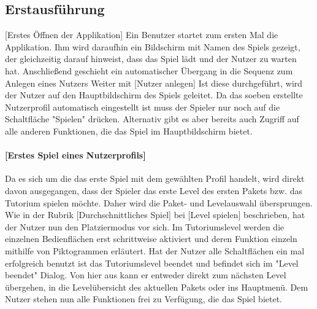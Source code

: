 \subsection{Erstausführung}
{[}Erstes Öffnen der Applikation{]}\newline
Ein Benutzer startet zum ersten Mal die Applikation. Ihm wird daraufhin
ein Bildschirm mit Namen des Spiels gezeigt, der gleichzeitig darauf
hinweist, dass das Spiel lädt und der Nutzer zu warten hat.
Anschließend geschieht ein automatischer Übergang in die Sequenz zum
Anlegen eines Nutzers
\newline
\newline
Weiter mit {[}Nutzer anlegen{]}
\newline
\newline
Ist diese durchgeführt, wird der Nutzer auf den Hauptbildschirm des
Spiels geleitet. Da das soeben erstellte Nutzerprofil automatisch eingestellt
ist muss der Spieler nur noch auf die Schaltfläche "Spielen" drücken.
Alternativ gibt es aber bereits auch Zugriff auf alle anderen Funktionen,
die das Spiel im Hauptbildschirm bietet.
\newline
\newline
\paragraph{{[}Erstes Spiel eines Nutzerprofils{]}}
Da es sich um die das erste Spiel mit dem gewählten Profil handelt, wird 
direkt davon ausgegangen, dass der Spieler das erste Level des ersten 
Pakets bzw. das Tutorium spielen möchte. Daher wird die Paket- und Levelauswahl 
übersprungen. Wie in der Rubrik [Durchschnittliches Spiel] bei [Level spielen] 
beschrieben, hat der Nutzer nun den Platziermodus vor sich. Im Tutoriumslevel 
werden die einzelnen Bedienflächen erst schrittweise aktiviert und deren Funktion
einzeln mithilfe von Piktogrammen erläutert. Hat der Nutzer alle Schaltflächen
ein mal erfolgreich benutzt ist das Tutoriumslevel beendet und befindet
sich im "Level beendet" Dialog. Von hier aus kann er entweder direkt zum
nächsten Level übergehen, in die Levelübersicht des aktuellen Pakets oder
ins Hauptmenü.
\newline
\newline
Dem Nutzer stehen nun alle Funktionen frei zu Verfügung, die das Spiel 
bietet.
